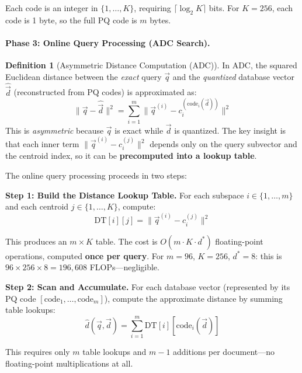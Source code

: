 \documentclass[11pt,a4paper]{article}
\theoremstyle{definition}
\newtheorem{definition}{Definition}[section]
\theoremstyle{plain}
\begin{document}
Each code is an integer in $\{1, \ldots, K\}$, requiring $\lceil \log_2 K \rceil$ bits. For $K = 256$, each code is 1 byte, so the full PQ code is $m$ bytes.

\paragraph{Phase 3: Online Query Processing (ADC Search).}

\begin{definition}[Asymmetric Distance Computation (ADC)]
\label{def:adc}
In ADC, the squared Euclidean distance between the \emph{exact} query $\vec{q}$ and the \emph{quantized} database vector $\hat{\vec{d}}$ (reconstructed from PQ codes) is approximated as:
\begin{equation}
\|\vec{q} - \hat{\vec{d}}\|^2 = \sum_{i=1}^{m} \|\vec{q}^{(i)} - c_i^{(\mathrm{code}_i(\vec{d}))}\|^2
\label{eq:adc}
\end{equation}
This is \emph{asymmetric} because $\vec{q}$ is exact while $\vec{d}$ is quantized. The key insight is that each inner term $\|\vec{q}^{(i)} - c_i^{(j)}\|^2$ depends only on the query subvector and the centroid index, so it can be \textbf{precomputed into a lookup table}.
\end{definition}

The online query processing proceeds in two steps:

\textbf{Step 1: Build the Distance Lookup Table.}
For each subspace $i \in \{1, \ldots, m\}$ and each centroid $j \in \{1, \ldots, K\}$, compute:
\begin{equation}
\mathrm{DT}[i][j] = \|\vec{q}^{(i)} - c_i^{(j)}\|^2
\label{eq:distance-table}
\end{equation}

This produces an $m \times K$ table. The cost is $O(m \cdot K \cdot d^*)$ floating-point operations, computed \textbf{once per query}. For $m = 96$, $K = 256$, $d^* = 8$: this is $96 \times 256 \times 8 = 196{,}608$ FLOPs---negligible.

\textbf{Step 2: Scan and Accumulate.}
For each database vector (represented by its PQ code $[\mathrm{code}_1, \ldots, \mathrm{code}_m]$), compute the approximate distance by summing table lookups:
\begin{equation}
\hat{d}(\vec{q}, \vec{d}) = \sum_{i=1}^{m} \mathrm{DT}[i][\mathrm{code}_i(\vec{d})]
\label{eq:pq-scan}
\end{equation}

This requires only $m$ table lookups and $m-1$ additions per document---no floating-point multiplications at all.
\end{document}
